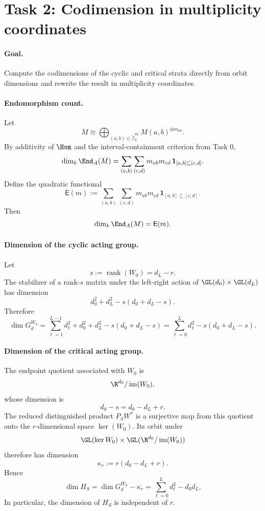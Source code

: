 \section*{Task 2: Codimension in multiplicity coordinates}

\paragraph{Goal.}
Compute the codimensions of the cyclic and critical strata directly from orbit
dimensions and rewrite the result in multiplicity coordinates.

\paragraph{Endomorphism count.}
Let
\[
M\cong \bigoplus_{(a,b)\in \widetilde{\mathcal I}_L^{\mathrm{wt}}}
M(a,b)^{\oplus m_{ab}}.
\]
By additivity of \(\Hom\) and the interval-containment criterion from Task 0,
\[
\dim_k \End_A(M)
=
\sum_{(a,b)}\sum_{(c,d)}
m_{ab}m_{cd}\,\mathbf 1_{[a,b]\subseteq [c,d]}.
\]
Define the quadratic functional
\[
\mathsf E(m)
:=
\sum_{(a,b)}\sum_{(c,d)}
m_{ab}m_{cd}\,\mathbf 1_{[a,b]\subseteq [c,d]}.
\]
Then
\[
\dim_k \End_A(M)=\mathsf E(m).
\]

\paragraph{Dimension of the cyclic acting group.}
Let
\[
s:=\operatorname{rank}(W_0)=d_L-r.
\]
The stabilizer of a rank-\(s\) matrix under the left-right action of
\(\GL(d_0)\times \GL(d_L)\) has dimension
\[
d_0^2+d_L^2-s(d_0+d_L-s).
\]
Therefore
\[
\dim G_d^{W_0}
=
\sum_{\ell=1}^{L-1} d_\ell^2
+
d_0^2+d_L^2-s(d_0+d_L-s)
=
\sum_{\ell=0}^{L} d_\ell^2-s(d_0+d_L-s).
\]

\paragraph{Dimension of the critical acting group.}
The endpoint quotient associated with \(W_0\) is
\[
\R^{d_0}/\operatorname{im}(W_0),
\]
whose dimension is
\[
d_0-s=d_0-d_L+r.
\]
The reduced distinguished product \(P_SW^\ast\) is a surjective map from this
quotient onto the \(r\)-dimensional space \(\ker(W_0)\). Its orbit under
\[
\GL(\ker W_0)\times \GL(\R^{d_0}/\operatorname{im}(W_0))
\]
therefore has dimension
\[
\kappa_r:=r(d_0-d_L+r).
\]
Hence
\[
\dim H_S
=
\dim G_d^{W_0}-\kappa_r
=
\sum_{\ell=0}^{L} d_\ell^2-d_0d_L.
\]
In particular, the dimension of \(H_S\) is independent of \(r\).

